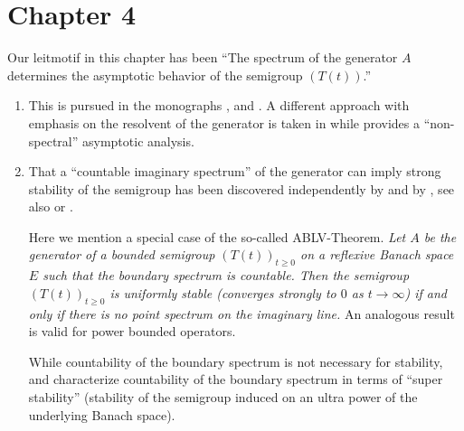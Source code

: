 \section*{Chapter 4}
Our leitmotif in this chapter has been
\enquote{The spectrum of the generator $A$ determines the asymptotic behavior of the semigroup $(T(t))$.}
\begin{enumerate}%

\item 

This is pursued in the monographs \textcite[Chapter V]{zbmath01354832}, 
\textcite[Sections 3 and 4]{zbmath00921898} and \textcite[Chapter III]{zbmath05625330}.
A different approach with emphasis on the resolvent of the generator is taken in 
\textcite[Chapter 5]{zbmath05842872} while  \textcite{zbmath05080033} provides a 
\enquote{non-spectral} asymptotic analysis.

\item
That a \enquote{countable imaginary spectrum} of the generator can imply strong stability of the semigroup has been discovered independently by  \textcite{zbmath04063855} and by \textcite{zbmath04042353}, see also
\textcite[Theorem 5.5.5]{zbmath05842872} or \textcite[Theorem 2.21]{zbmath01354832}.

Here we mention a  special case of the so-called ABLV-Theorem. 
\textit{Let $A$ be the generator of a bounded semigroup $(T(t))_{t\geq 0}$ on a reflexive Banach space $E$ such that the boundary spectrum is countable. 
Then the semigroup  $(T(t))_{t\geq 0}$ is uniformly stable (\ie converges strongly to $0$ as $t \rightarrow \infty$) if and only if there is no point spectrum on the imaginary line. }
An analogous result is valid for power bounded operators. 

While countability of the boundary spectrum  is not necessary for stability, 
\textcite{zbmath00410037} and \textcite{zbmath0493176} characterize countability of the boundary spectrum in terms of \enquote{super stability} (\ie stability of the semigroup induced on an ultra power of the underlying Banach space).



\end{enumerate}
